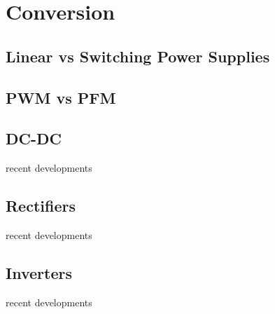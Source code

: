 \chapter{Conversion}
\label{ch:conv}

\section{Linear vs Switching Power Supplies}

\section{PWM vs PFM}

\section{DC-DC}
recent developments

\section{Rectifiers}
recent developments

\section{Inverters}
recent developments
